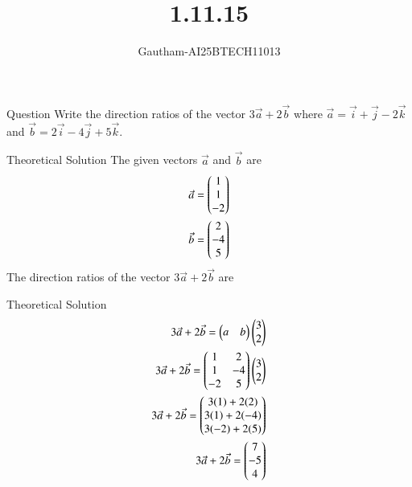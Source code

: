 \documentclass{beamer}
\title %
{1.11.15}
\author %
{Gautham-AI25BTECH11013}
\begin{document}
\frame{\titlepage}
\begin{frame}{Question}
Write the direction ratios of the vector 3$\Vec{a}+2\Vec{b}$ where $\Vec{a}=\overrightarrow{i}+\overrightarrow{j}-2\overrightarrow{k}$ and $\Vec{b}=2\overrightarrow{i}-4\overrightarrow{j}+5\overrightarrow{k}$.
\end{frame}
\begin{frame}{Theoretical Solution}
The given vectors $\Vec{a}$ and $\Vec{b}$ are 
\begin{align}
\Vec{a}=\begin{pmatrix}1 \\ 1 \\ -2\end{pmatrix} \\
\Vec{b}=\begin{pmatrix}2 \\ -4 \\ 5\end{pmatrix}
\end{align}
The direction ratios of the vector $3\Vec{a}+2\Vec{b}$ are
\end{frame}
\begin{frame}{Theoretical Solution}
\begin{align}
  3\Vec{a}+2\Vec{b}=\begin{pmatrix}a&b\end{pmatrix}\begin{pmatrix}3 \\ 2\end{pmatrix}\\
  3\Vec{a}+2\Vec{b}=\begin{pmatrix}1 & 2 \\ 1 &-4 \\ -2 & 5\end{pmatrix}\begin{pmatrix}3\\2\end{pmatrix}\\
  3\Vec{a}+2\Vec{b}=\begin{pmatrix}3(1)+2(2)\\3(1)+2(-4)\\3(-2)+2(5)\end{pmatrix}\\
  3\Vec{a}+2\Vec{b}=\begin{pmatrix}7\\-5\\4\end{pmatrix}
\end{align}
\end{frame}
\end{document}

